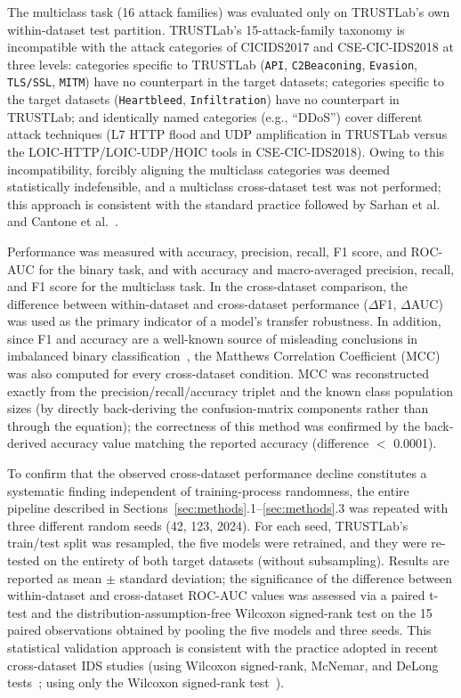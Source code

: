 \documentclass[a4paper,fleqn]{cas-sc}
\begin{document}
The multiclass task (16 attack families) was evaluated only on TRUSTLab's own within-dataset test partition. TRUSTLab's 15-attack-family taxonomy is incompatible with the attack categories of CICIDS2017 and CSE-CIC-IDS2018 at three levels: categories specific to TRUSTLab (\texttt{API}, \texttt{C2Beaconing}, \texttt{Evasion}, \texttt{TLS/SSL}, \texttt{MITM}) have no counterpart in the target datasets; categories specific to the target datasets (\texttt{Heartbleed}, \texttt{Infiltration}) have no counterpart in TRUSTLab; and identically named categories (e.g., ``DDoS'') cover different attack techniques (L7 HTTP flood and UDP amplification in TRUSTLab versus the LOIC-HTTP/LOIC-UDP/HOIC tools in CSE-CIC-IDS2018). Owing to this incompatibility, forcibly aligning the multiclass categories was deemed statistically indefensible, and a multiclass cross-dataset test was not performed; this approach is consistent with the standard practice followed by Sarhan et al.~\cite{Sarhan2022a,Sarhan2022b} and Cantone et al.~\cite{Cantone2024}.

Performance was measured with accuracy, precision, recall, F1 score, and ROC-AUC for the binary task, and with accuracy and macro-averaged precision, recall, and F1 score for the multiclass task. In the cross-dataset comparison, the difference between within-dataset and cross-dataset performance ($\Delta$F1, $\Delta$AUC) was used as the primary indicator of a model's transfer robustness. In addition, since F1 and accuracy are a well-known source of misleading conclusions in imbalanced binary classification~\cite{ChiccoJurman2020}, the Matthews Correlation Coefficient (MCC) was also computed for every cross-dataset condition. MCC was reconstructed exactly from the precision/recall/accuracy triplet and the known class population sizes (by directly back-deriving the confusion-matrix components rather than through the equation); the correctness of this method was confirmed by the back-derived accuracy value matching the reported accuracy (difference $<$ 0.0001).

To confirm that the observed cross-dataset performance decline constitutes a systematic finding independent of training-process randomness, the entire pipeline described in Sections~\ref{sec:methods}.1--\ref{sec:methods}.3 was repeated with three different random seeds (42, 123, 2024). For each seed, TRUSTLab's train/test split was resampled, the five models were retrained, and they were re-tested on the entirety of both target datasets (without subsampling). Results are reported as mean $\pm$ standard deviation; the significance of the difference between within-dataset and cross-dataset ROC-AUC values was assessed via a paired t-test and the distribution-assumption-free Wilcoxon signed-rank test on the 15 paired observations obtained by pooling the five models and three seeds. This statistical validation approach is consistent with the practice adopted in recent cross-dataset IDS studies (using Wilcoxon signed-rank, McNemar, and DeLong tests~\cite{Alshammari2026}; using only the Wilcoxon signed-rank test~\cite{Eren2026}).
\end{document}
